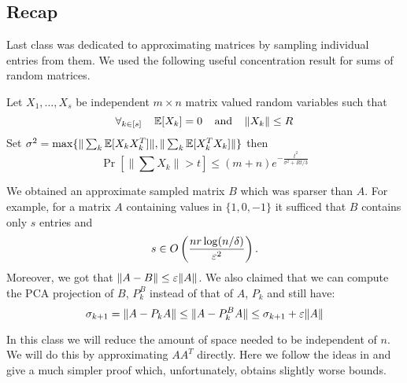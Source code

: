 


\subsection*{Recap} Last class was dedicated to approximating matrices by sampling individual entries from them.
We used the following useful concentration result for sums of random matrices.

\begin{lemma}
Let $X_1,\ldots, X_s$ be independent $m \times n$ matrix valued random variables such that 
\[
\forall _{k \in [s]} \mbox{\;\;\;\;} {\mathbb E}[X_k] = 0 \mbox{\;\;\;\;and\;\;\;\;} \|X_k\| \le R
\]
Set $\sigma^2 = \max\{\|\sum_k {\mathbb E}[X_k X_k^T]\|, \|\sum_k {\mathbb E}[X_k^T X_k]\|\}$ then
\[
\Pr[\|\sum X_{k}\| > t] \le (m+n)e^{-\frac{t^2}{\sigma^2 + Rt/3}}
\]
\end{lemma}
%
\noindent We obtained an approximate sampled matrix $B$ which was sparser than $A$.
For example, for a matrix $A$ containing values in $\{1,0,-1\}$ it sufficed that $B$ contains only $s$ entries and 
\[
s \in O\left(\frac{nr \log(n/\delta)}{\varepsilon^2}\right).
\]
Moreover, we got that $\|A - B\| \le \varepsilon \|A\|$. 
We also claimed that we can compute the PCA projection of $B$, $P_k^B$ instead of that of $A$, $P_k$ and still have:
 \[
 \sigma_{k+1} =  \|A - P_k A\|  \le \|A - P_k^B A\| \le \sigma_{k+1} + \varepsilon\|A\|
 \]

\noindent In this class we will reduce the amount of space needed to be independent of $n$. We will do this by approximating $AA^T$ directly.
Here we follow the ideas in \cite{rvSamplingFromLargeMatrices2007} and give a much simpler proof which, unfortunately, obtains slightly worse bounds.

